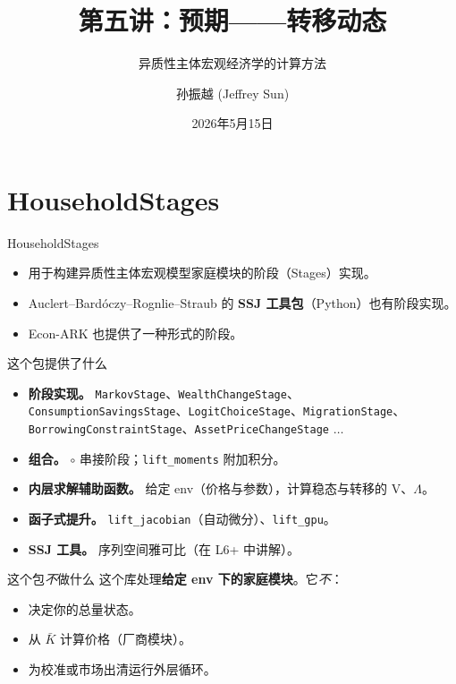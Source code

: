 \documentclass[10pt,aspectratio=169]{beamer}
\title{第五讲：预期——转移动态}
\subtitle{异质性主体宏观经济学的计算方法}
\author{孙振越 (Jeffrey Sun)}
\institute{多伦多大学}
\date{2026年5月15日}
\begin{document}
\maketitle

\section[HouseholdStages]{HouseholdStages}

\begin{frame}{HouseholdStages}
  \begin{itemize}
    \item 用于构建异质性主体宏观模型家庭模块的阶段（Stages）实现。
    \item Auclert--Bardóczy--Rognlie--Straub 的 \textbf{SSJ 工具包}（Python）也有阶段实现。
    \item Econ-ARK 也提供了一种形式的阶段。
  \end{itemize}
\end{frame}

\begin{frame}{这个包提供了什么}
  \begin{itemize}
    \item \textbf{阶段实现。} \texttt{MarkovStage}、\texttt{WealthChangeStage}、\texttt{ConsumptionSavingsStage}、\texttt{LogitChoiceStage}、\texttt{MigrationStage}、\texttt{BorrowingConstraintStage}、\texttt{AssetPriceChangeStage} $\dots$
    \item \textbf{组合。} \texttt{$\circ$} 串接阶段；\texttt{lift\_moments} 附加积分。
    \item \textbf{内层求解辅助函数。} 给定 env（价格与参数），计算稳态与转移的 V、$\Lambda$。
    \item \textbf{函子式提升。} \texttt{lift\_jacobian}（自动微分）、\texttt{lift\_gpu}。
    \item \textbf{SSJ 工具。} 序列空间雅可比（在 L6+ 中讲解）。
  \end{itemize}
\end{frame}

\begin{frame}{这个包\emph{不}做什么}
  这个库处理\textbf{给定 env 下的家庭模块}。它\emph{不}：
  \begin{itemize}
    \item 决定你的总量状态。
    \item 从 $\bar K$ 计算价格（厂商模块）。
    \item 为校准或市场出清运行外层循环。
  \end{itemize}
\end{frame}
\end{document}
